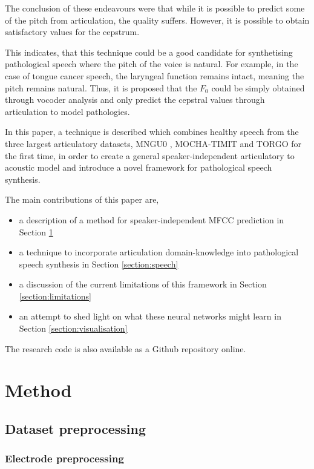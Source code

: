 \documentclass[a4paper]{article}
\begin{document}
The conclusion of these endeavours were that while it is possible to
predict some of the pitch from articulation, the quality suffers.
However, it is possible to obtain satisfactory values for the
cepstrum.

This indicates, that this technique could be a good candidate for synthetising
pathological speech where the pitch of the voice is natural. For example,
in the case of tongue cancer speech, the laryngeal function remains intact,
meaning the pitch remains natural. Thus, it is proposed that the \( F_0 \) could
be simply obtained through vocoder analysis and only predict the cepstral
values through articulation to model pathologies.

In this paper, a technique is described which combines healthy speech
from the three largest articulatory datasets, MNGU0 \cite{Richmond2011},
MOCHA-TIMIT and TORGO \cite{Rudzicz2012} for the first time, in order to
create a general speaker-independent articulatory to acoustic model and
introduce a novel framework for pathological speech synthesis.

\vspace{0.5em}
The main contributions of this paper are,
\begin{itemize}
\setlength\itemsep{-0.3em}
\item a description of a method for speaker-independent MFCC prediction in Section \ref{section:method}
\item a technique to incorporate articulation domain-knowledge into pathological
  speech synthesis in Section \ref{section:speech} 
\item a discussion of the current limitations of this framework in Section \ref{section:limitations}
\item an attempt to shed light on what these neural networks might learn in Section \ref{section:visualisation}
\end{itemize}

The research code is also available as a Github repository online. \cite{Halpern2019}

\section{Method} \label{section:method}
\subsection{Dataset preprocessing}

\subsubsection{Electrode preprocessing}
\end{document}
